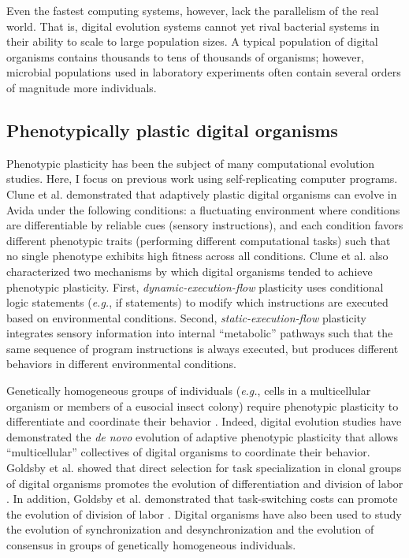 Even the fastest computing systems, however, lack the parallelism of the real world.
That is, digital evolution systems cannot yet rival bacterial systems in their ability to scale to large population sizes. 
A typical population of digital organisms contains thousands to tens of thousands of organisms; however, microbial populations used in laboratory experiments often contain several orders of magnitude more individuals.

\subsection{Phenotypically plastic digital organisms}

Phenotypic plasticity has been the subject of many computational evolution studies. %
Here, I focus on previous work using self-replicating computer programs. 
Clune et al. demonstrated that adaptively plastic digital organisms can evolve in Avida under the following conditions:  
a fluctuating environment where conditions are differentiable by reliable cues (sensory instructions), and each condition favors different phenotypic traits (performing different computational tasks) such that no single phenotype exhibits high fitness across all conditions. 
Clune et al. also characterized two mechanisms by which digital organisms tended to achieve phenotypic plasticity.
First, \textit{dynamic-execution-flow} plasticity uses conditional logic statements (\textit{e.g.}, if statements) to modify which instructions are executed based on environmental conditions. 
Second, \textit{static-execution-flow} plasticity integrates sensory information into internal ``metabolic'' pathways such that the same sequence of program instructions is always executed, but produces different behaviors in different environmental conditions.

Genetically homogeneous groups of individuals (\textit{e.g.}, cells in a multicellular organism or members of a eusocial insect colony) require phenotypic plasticity to differentiate and coordinate their behavior \citep{schlichting_origins_2003}. 
Indeed, digital evolution studies have demonstrated the \textit{de novo} evolution of adaptive phenotypic plasticity that allows  ``multicellular'' collectives of digital organisms to coordinate their behavior.
Goldsby et al. showed that direct selection for task specialization in clonal groups of digital organisms promotes the evolution of differentiation and division of labor \citep{goldsby_evolution_2010}.
In addition, Goldsby et al. demonstrated that task-switching costs can promote the evolution of division of labor \citep{goldsby_evolution_2010,goldsby_task-switching_2012}.
Digital organisms have also been used to study the evolution of synchronization and desynchronization \citep{knoester_evolution_2011} and the evolution of consensus \citep{knoester_genetic_2013} in groups of genetically homogeneous individuals. %

